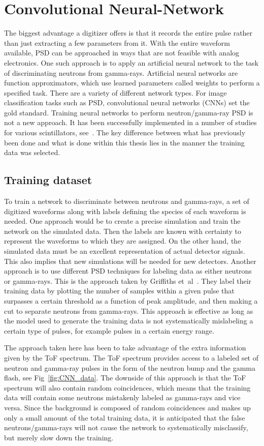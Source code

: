 \documentclass[main.tex]{subfiles}
\begin{document}
\section{Convolutional Neural-Network}\label{sec:cnn}
The biggest advantage a digitizer offers is that it records the entire pulse rather than just extracting a few parameters from it. With the entire waveform available, PSD can be approached in ways that are not feasible with analog electronics. One such approach is to apply an artificial neural network to the task of discriminating neutrons from gamma-rays. 
Artificial neural networks are function approximators, which use learned parameters called weights to perform a specified task. There are a variety of different network types. For image classification tasks such as PSD, convolutional neural networks (CNNs) set the gold standard. Training neural networks to perform neutron/gamma-ray PSD is not a new approach. It has been successfully implemented in a number of studies for various scintillators, see~\cite{Griffiths}. The key difference between what has previously been done and what is done within this thesis lies in the manner the training data was selected.

\subsection{Training dataset}
To train a network to discriminate between neutrons and gamma-rays, a set of digitized waveforms along with labels defining the species of each waveform is needed. One approach would be to create a precise simulation and train the network on the simulated data. Then the labels are known with certainty to represent the waveforms to which they are assigned. On the other hand, the simulated data must be an excellent representation of actual detector signals. This also implies that new simulations will be needed for new detectors. Another approach is to use different PSD techniques for labeling data as either neutrons or gamma-rays. This is the approach taken by  Griffiths et~al~\cite{Griffiths}. They label their training data by plotting the number of samples within a given pulse that surpasses a certain threshold as a function of peak amplitude, and then making a cut to separate neutrons from gamma-rays. This approach is effective as long as the model used to generate the training data is not systematically mislabeling a certain type of pulses, for example pulses in a certain energy range. 

The approach taken here has been to take advantage of the extra information given by the ToF spectrum. The ToF spectrum provides access to a labeled set of neutron and gamma-ray pulses in the form of the neutron bump and the gamma flash, see Fig~\ref{fig:CNN_data}. The downside of this approach is that the ToF spectrum will also contain random coincidences, which means that the training data will contain some neutrons mistakenly labeled as gamma-rays and vice versa. Since the background is composed of random coincidences and makes up only a small amount of the total training data, it is anticipated that the false neutrons/gamma-rays will not cause the network to systematically misclassify, but merely slow down the training.
\end{document}
